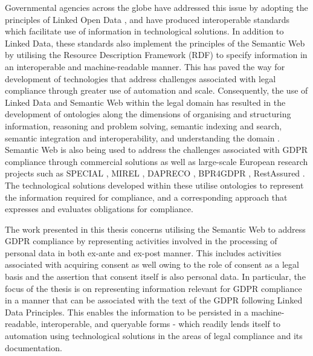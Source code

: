 Governmental agencies across the globe have addressed this issue by adopting the principles of Linked Open Data \cite{bizer_linked_2011}, and have produced interoperable standards \cite{palmirani_akoma_2018,european_union_eli_2015,van_opijnen_european_2011} which facilitate use of information in technological solutions.
In addition to Linked Data, these standards also implement the principles of the Semantic Web \cite{noauthor_semantic_nodate} by utilising the Resource Description Framework (RDF) \cite{noauthor_rdf_2014} to specify information in an interoperable and machine-readable manner.
This has paved the way for development of technologies that address challenges associated with legal compliance through greater use of automation and scale.
Consequently, the use of Linked Data and Semantic Web within the legal domain has resulted in the development of ontologies along the dimensions of organising and structuring information, reasoning and problem solving, semantic indexing and search, semantic integration and interoperability, and understanding the domain \cite{rodrigues_legal_2019}.
Semantic Web is also being used to address the challenges associated with GDPR compliance through commercial solutions as well as large-scale European research projects such as SPECIAL \cite{noauthor_scalable_nodate}, MIREL \cite{noauthor_mirel_nodate}, DAPRECO \cite{noauthor_data_2018-1}, BPR4GDPR \cite{noauthor_bpr4gdpr_nodate}, RestAssured \cite{noauthor_restassured_nodate}.
The technological solutions developed within these utilise ontologies to represent the information required for compliance, and a corresponding approach that expresses and evaluates obligations for compliance.

The work presented in this thesis concerns utilising the Semantic Web to address GDPR compliance by representing activities involved in the processing of personal data in both ex-ante and ex-post manner.
This includes activities associated with acquiring consent as well owing to the role of consent as a legal basis and the assertion that consent itself is also personal data.
In particular, the focus of the thesis is on representing information relevant for GDPR compliance in a manner that can be associated with the text of the GDPR following Linked Data Principles.
This enables the information to be persisted in a machine-readable, interoperable, and queryable forms - which readily lends itself to automation using technological solutions in the areas of legal compliance and its documentation.

